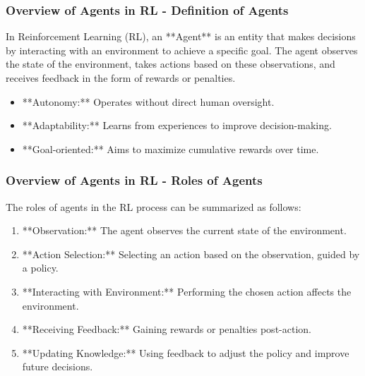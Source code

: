 \documentclass{beamer}
\begin{document}
\begin{frame}[fragile]
    \frametitle{Overview of Agents in RL - Definition of Agents}

    In Reinforcement Learning (RL), an **Agent** is an entity that makes decisions by interacting with an environment to achieve a specific goal. The agent observes the state of the environment, takes actions based on these observations, and receives feedback in the form of rewards or penalties.

    \begin{itemize}
        \item **Autonomy:** Operates without direct human oversight.
        \item **Adaptability:** Learns from experiences to improve decision-making.
        \item **Goal-oriented:** Aims to maximize cumulative rewards over time.
    \end{itemize}
\end{frame}

\begin{frame}[fragile]
    \frametitle{Overview of Agents in RL - Roles of Agents}

    The roles of agents in the RL process can be summarized as follows:

    \begin{enumerate}
        \item **Observation:** The agent observes the current state of the environment.
        \item **Action Selection:** Selecting an action based on the observation, guided by a policy.
        \item **Interacting with Environment:** Performing the chosen action affects the environment.
        \item **Receiving Feedback:** Gaining rewards or penalties post-action.
        \item **Updating Knowledge:** Using feedback to adjust the policy and improve future decisions.
    \end{enumerate}
\end{frame}
\end{document}
